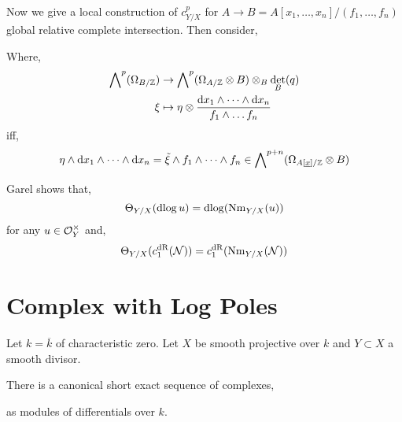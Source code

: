 \documentclass[12pt]{article}
\begin{document}
\begin{remark}
Now we give a local construction of $c^p_{Y/X}$ for $A \to B  = A[x_1, \dots, x_n] /(f_1, \dots, f_n)$ global relative complete intersection. Then consider,
\begin{center}
\end{center}
Where,
\begin{align*}
\bigwedge\nolimits^p (\Omega_{B / \mathbb{Z}}) & \to \bigwedge\nolimits^p (\Omega_{A /\mathbb{Z}} \otimes B) \otimes_B \det_B(q)
\\
\xi & \mapsto \eta \otimes \frac{\mathrm{d}{x_1} \wedge \dots \wedge \mathrm{d}{x_n}}{f_1 \wedge \dots f_n} 
\end{align*}
iff,
\[ \eta \wedge \mathrm{d}{x_1} \wedge \cdots \wedge \mathrm{d}{x_n} = \tilde{\xi} \wedge f_1 \wedge \cdots \wedge f_n \in \bigwedge\nolimits^{p + n} ( \Omega_{A[\underline{x}]/\mathbb{Z}} \otimes B) \]
\end{remark}

\begin{remark}
Garel shows that,
\[ \Theta_{Y/X}(\mathrm{d}{\log{u}}) = \mathrm{d}{\log}(\mathrm{Nm}_{Y/X}(u)) \]
for any $u \in \mathcal{O}_{Y}^\times$ and,
\[ \Theta_{Y/X}(c_1^{\mathrm{dR}}(\mathcal{N})) = c_1^{\mathrm{dR}}(\mathrm{Nm}_{Y/X}(\mathcal{N})) \]
\end{remark}

\section{Complex with Log Poles}

Let $k = \overline{k}$ of characteristic zero. Let $X$ be smooth projective over $k$ and $Y \subset X$ a smooth divisor. 

\begin{proposition}
There is a canonical short exact sequence of complexes,
\begin{center}
as modules of differentials over $k$.
\end{center}
\end{proposition}
\end{document}
